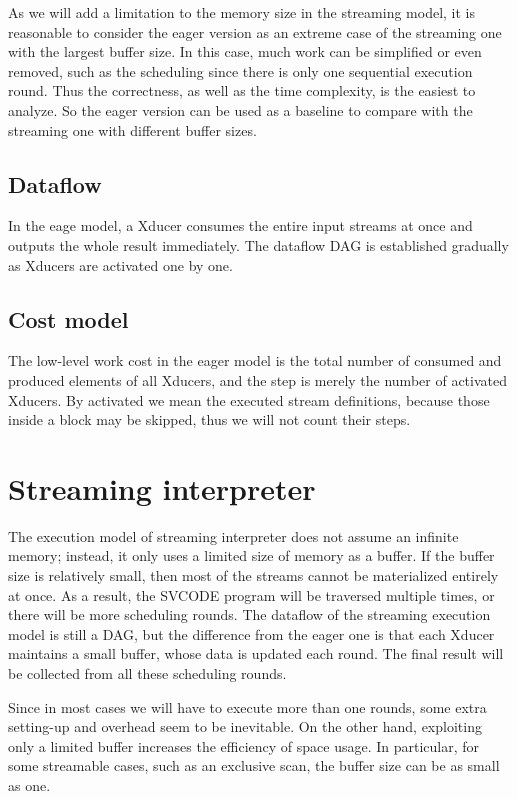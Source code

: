 As we will add a limitation to the memory size in the streaming model, it is reasonable to consider the eager version as an extreme case  of the streaming one with the largest buffer size. 
In this case, much work can be simplified or even removed, such as the scheduling since there is only one sequential execution round. 
Thus the correctness, as well as the time complexity, is the easiest to analyze. 
So the eager version can be used as a baseline to compare with the streaming one with different buffer sizes.


\subsection{Dataflow}
In the eage model, a Xducer consumes the entire input streams at once and outputs the whole result immediately. 
The dataflow DAG is established gradually as Xducers are activated one by one.   

\subsection{Cost model}
The low-level work cost in the eager model is the total number of consumed and produced elements of all Xducers, and the step is merely the number of activated Xducers. 
By activated we mean the executed stream definitions, because those inside a \wc block may be skipped, thus we will not count their steps. 


\section{Streaming interpreter}
The execution model of streaming interpreter does not assume an infinite memory; instead, it only uses a limited size of memory as a buffer. 
If the buffer size is relatively small, then most of the streams cannot be materialized entirely at once. 
As a result, the SVCODE program will be traversed multiple times, or there will be more scheduling rounds. 
The dataflow of the streaming execution model is still a DAG, but the difference from the eager one is that each Xducer maintains a small buffer, whose data is updated each round. 
The final result will be collected from all these scheduling rounds.

Since in most cases we will have to execute more than one rounds, some extra setting-up and overhead seem to be inevitable.
On the other hand, exploiting only a limited buffer increases the efficiency of space usage. 
In particular, for some streamable cases, such as an exclusive scan, the buffer size can be as small as one.


